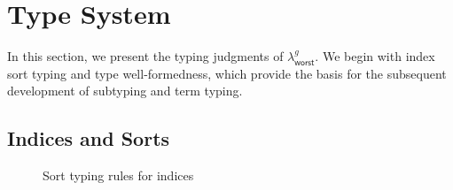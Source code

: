 \FloatBarrier

\section{Type System}
\label{sec:worst-case-type-system}
In this section, we present the typing judgments of $\lambda^g_{\mathsf{worst}}$.
We begin with index sort typing and type well-formedness, which provide the basis for the subsequent development of subtyping and term typing.


\subsection{Indices and Sorts}

\begin{figure}[!htbp]
  \small
  \caption{Sort typing rules for indices}
  \label{defn:worst-case-sort-rule}
\end{figure}

